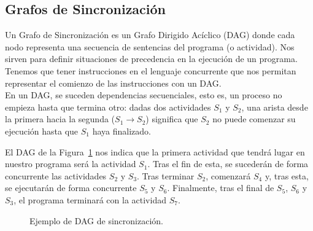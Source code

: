 \subsection{Grafos de Sincronización}
Un Grafo de Sincronización es un Grafo Dirigido Acíclico (DAG) donde cada nodo representa una secuencia de sentencias del programa (o actividad). Nos sirven para definir situaciones de precedencia en la ejecución de un programa. Tenemos que tener instrucciones en el lenguaje concurrente que nos permitan representar el comienzo de las instrucciones con un DAG\@.\\

En un DAG, se suceden dependencias secuenciales, esto es, un proceso no empieza hasta que termina otro: dadas dos actividades $S_1$ y $S_2$, una arista desde la primera hacia la segunda ($S_1\rightarrow S_2$) significa que $S_2$ no puede comenzar su ejecución hasta que $S_1$ haya finalizado.\\

\begin{ejemplo}
    El DAG de la Figura~\ref{fig:primer_dag} nos indica que la primera actividad que tendrá lugar en nuestro programa será la actividad $S_1$. Tras el fin de esta, se sucederán de forma concurrente las actividades $S_2$ y $S_3$. Tras terminar $S_2$, comenzará $S_4$ y, tras esta, se ejecutarán de forma concurrente $S_5$ y $S_6$. Finalmente, tras el final de $S_5$, $S_6$ y $S_3$, el programa terminará con la actividad $S_7$.

    \begin{figure}[H]
    \centering
    \caption{Ejemplo de DAG de sincronización.}
    \label{fig:primer_dag}
    \end{figure}
\end{ejemplo}

